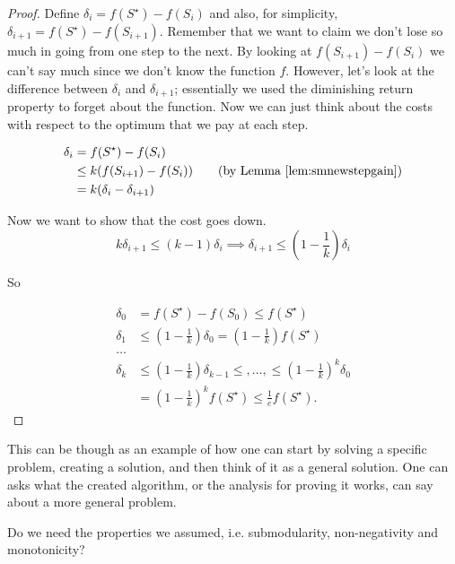 \begin{proof}
Define $\delta_i = f(S^\star) - f(S_i)$ and also, for simplicity, $\delta_{i+1} = f(S^\star) - f(S_{i+1})$. 
Remember that we want to claim we don't lose so much in going from one step to the next. By looking at $f(S_{i+1}) - f(S_i)$ we can't say much since we don't know the function $f$. However, let's look at the difference between $\delta_i$ and $\delta_{i+1}$; essentially we used the diminishing return property to forget about the function. Now we can just think about the costs with respect to the optimum that we pay at each step.


\begin{align}
	\delta_i &= f(S^\star) - f(S_i)\\
	&\leq k(f(S_{i+1}) - f(S_i)) \tag{by Lemma \ref{lem:smnewstepgain}}\\
	&= k(\delta_i - \delta_{i+1})
\end{align}

Now  we want to show that the cost goes down.
\begin{equation}
k\delta_{i+1} \leq (k-1)\delta_i \implies \delta_{i+1} \leq \left(1-\frac{1}{k}\right)\delta_i
\end{equation}

So

\begin{align}
\delta_0 &= f(S^\star) - f(S_0) \leq f(S^\star) \tag{f non-negative}\\
\delta_1 &\leq \left(1 - \frac{1}{k}\right) \delta_0 = \left(1-\frac{1}{k}\right)f(S^\star)\\
\ldots\\
\delta_k &\leq \left(1-\frac{1}{k}\right)\delta_{k-1} \leq ,\ldots, \leq \left(1-\frac{1}{k}\right)^k\delta_0 \\
&=\left(1-\frac{1}{k}\right)^kf(S^\star) \leq \frac{1}{e}f(S^\star).
\end{align}
\end{proof}

This can be though as an example of how one can start by solving a specific problem, creating a solution, and then think of it as a general solution. One can asks what the created algorithm, or the analysis for proving it works, can say about a more general problem.

Do we need the properties we assumed, i.e. submodularity, non-negativity and monotonicity? 


